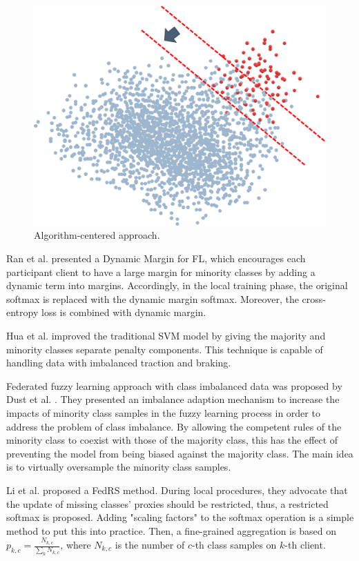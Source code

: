 \documentclass[10pt,journal,compsoc]{IEEEtran}
\begin{document}
	\begin{figure}[h]
		\centering
		\includegraphics[scale=0.5]{algorithm.png}
		\centering
		\caption{Algorithm-centered approach.}
		\label{algorithm}
	\end{figure}
	
	Ran et al. \cite{ran2021dynamic} presented a Dynamic Margin for FL, which encourages each participant client to have a large margin for minority classes by adding a dynamic term into margins. Accordingly, in the local training phase, the original softmax is replaced with the dynamic margin softmax. Moreover, the cross-entropy loss is combined with dynamic margin.
	
	Hua et al. \cite{hua2020blockchain} improved the traditional SVM model by giving the majority and minority classes separate penalty components. This technique is capable of handling data with imbalanced traction and braking. 
	
	Federated fuzzy learning approach with class imbalanced data was proposed by Dust et al. \cite{dust2021federated}. They presented an imbalance adaption mechanism to increase the impacts of minority class samples in the fuzzy learning process in order to address the problem of class imbalance. By allowing the competent rules of the minority class to coexist with those of the majority class, this has the effect of preventing the model from being biased against the majority class. The main idea is to virtually oversample the minority class samples. 
	
	Li et al. proposed  \cite{li2021fedrs} a FedRS method. During local procedures, they advocate that the update of missing classes’ proxies should be restricted, thus, a restricted softmax is proposed. Adding "scaling factors" to the softmax operation is a simple method to put this into practice. Then, a fine-grained aggregation is based on $p_{k,c}=\frac{N_{k,c}}{ {\textstyle \sum_{k}^{}} N_{k,c}}$, where $N_{k,c}$ is the number of $ c $-th class samples on $ k $-th client. 
	
\end{document}
